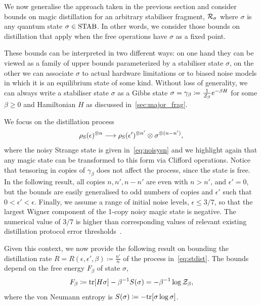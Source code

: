 \documentclass[pra,
aps,
twocolumn,
superscriptaddress,
groupedaddress,
nofootinbib,
reprint
]{revtex4-1}
\begin{document}
We now generalise the approach taken in the previous section and consider bounds on magic distillation for an arbitrary stabiliser fragment, $\mathcal{R}_\sigma$ where $\sigma$ is any quantum state $\sigma \in {\rm{STAB}}$.
In other words, we consider those bounds on distillation that apply when the free operations have $\sigma$ as a fixed point.

These bounds can be interpreted in two different ways: on one hand they can be viewed as a family of upper bounds parameterized by a stabiliser state $\sigma$, on the other we can associate $\sigma$ to actual hardware limitations or to biased noise models in which it is an equilibrium state of some kind. 
Without loss of generality, we can always write a stabiliser state $\sigma$ as a Gibbs state $\sigma = \gamma_\beta \coloneqq \frac{1}{\mathcal{Z}_\beta} e^{-\beta H}$ for some $\beta \geq 0$ and Hamiltonian $H$ as discussed in~\cref{sec:major_frag}.

We focus on the distillation process
\begin{equation}\label{eq:stdist}
	\rho_{\rm{S}}(\epsilon)^{\otimes n} \longrightarrow \rho_{\rm{S}}(\epsilon')^{\otimes n'} \otimes \sigma^{\otimes (n-n')},
\end{equation}
where the noisy Strange state is given in~\cref{eq:noisysn} and we highlight again that any magic state can be transformed to this form via Clifford operations.
Notice that tensoring in copies of $\gamma_\beta$ does not affect the process, since the state is free.
In the following result, all copies $n, n', n - n'$ are even with $n > n'$, and $\epsilon'=0$, but the bounds are easily generalised to odd numbers of copies and $\epsilon'$ such that $0 < \epsilon' < \epsilon$. 
Finally, we assume a range of initial noise levels, $\epsilon \leq 3/7$, so that the largest Wigner component of the 1-copy noisy magic state is negative.
The numerical value of $3/7$ is higher than corresponding values of relevant existing distillation protocol error thresholds~\cite{cit:bravyi,cit:prakash}.

Given this context, we now provide the following result on bounding the distillation rate $R = R(\epsilon, \epsilon', \beta) \coloneqq \frac{n'}{n}$ of the process in~\cref{eq:stdist}.
The bounds depend on the free energy $F_\beta$ of state $\sigma$,
\begin{equation}
	F_\beta \coloneqq {\rm{tr}}[H \sigma] - \beta^{-1}S(\sigma) = -\beta^{-1}\log{\mathcal{Z}_\beta},
\end{equation}
where the von Neumann entropy is $S(\sigma) \coloneqq -{\rm{tr}}[\sigma\log{\sigma}]$.
\end{document}
